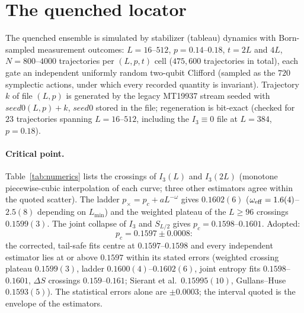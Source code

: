 \documentclass[11pt]{article}
\begin{document}
\section{The quenched locator}\label{sec:quenched}

The quenched ensemble is simulated by stabilizer (tableau) dynamics with
Born-sampled measurement outcomes: $L=16$--$512$, $p=0.14$--$0.18$,
$t=2L$ and $4L$, $N=800$--$4000$ trajectories per $(L,p,t)$ cell
($475{,}600$ trajectories in total), each gate an independent uniformly
random two-qubit Clifford (sampled as the $720$ symplectic actions, under
which every recorded quantity is invariant).  Trajectory $k$ of file
$(L,p)$ is generated by the legacy MT19937 stream seeded with
$\mathit{seed0}(L,p)+k$, $\mathit{seed0}$ stored in the file; regeneration
is bit-exact (checked for $23$ trajectories spanning $L=16$--$512$,
including the $I_3\equiv0$ file at $L=384$, $p=0.18$).

\paragraph{Critical point.}
Table~\ref{tab:numerics} lists the crossings of $I_3(L)$ and $I_3(2L)$
(monotone piecewise-cubic interpolation of each curve; three other
estimators agree within the quoted scatter).  The ladder
$p_\times=p_c+aL^{-\omega}$ gives $0.1602(6)$
($\omega_{\rm eff}=1.6(4)$--$2.5(8)$ depending on $L_{\min}$) and the
weighted plateau of the $L\ge96$ crossings $0.1599(3)$.  The joint collapse
of $I_3$ and $S_{L/2}$ gives $p_c=0.1598$--$0.1601$.  Adopted:
\begin{equation}
  p_c=0.1597\pm0.0008:
  \label{eq:adoptedpc}
\end{equation}
the corrected, tail-safe fits centre at $0.1597$--$0.1598$ and every
independent estimator lies at or above $0.1597$ within its stated errors
(weighted crossing plateau $0.1599(3)$, ladder $0.1600(4)$--$0.1602(6)$,
joint entropy fits $0.1598$--$0.1601$, $\Delta S$ crossings
$0.159$--$0.161$; Sierant et al.\ $0.15995(10)$, Gullans--Huse
$0.1593(5)$).  The statistical errors alone are $\pm0.0003$; the interval
quoted is the envelope of the estimators.
\end{document}
